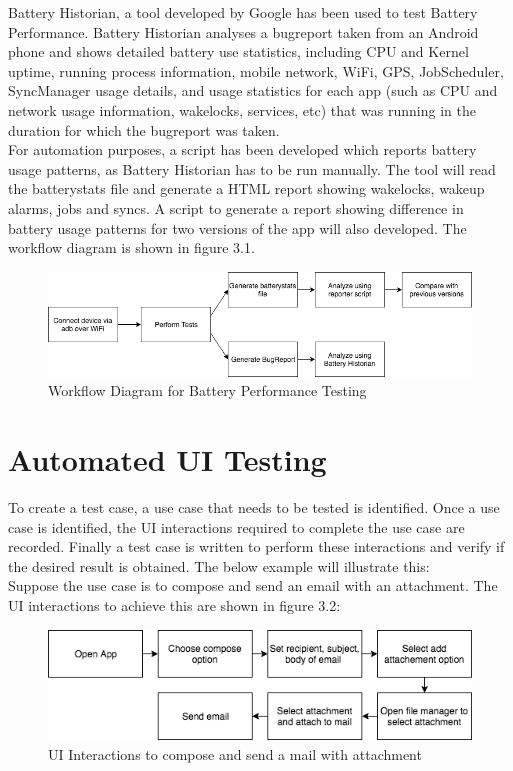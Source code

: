 Battery Historian, a tool developed by Google has been used to test Battery Performance. Battery Historian analyses a bugreport taken from an Android phone and shows detailed battery use statistics, including CPU and Kernel uptime, running process information, mobile network, WiFi, GPS, JobScheduler, SyncManager usage details, and usage statistics for each app (such as CPU and network usage information, wakelocks, services, etc) that was running in the duration for which the bugreport was taken.\cite{batteryhistorian} \\

For automation purposes, a script has been developed which reports battery usage patterns, as Battery Historian has to be run manually. The tool will read the batterystats file and generate a HTML report showing wakelocks, wakeup alarms, jobs and syncs. A script to generate a report showing difference in battery usage patterns for two versions of the app will also developed. The workflow diagram is shown in figure 3.1.

\begin{figure}[!h]
 	\begin{center}
		\includegraphics[scale=0.6]{Workflow}
		\caption{Workflow Diagram for Battery Performance Testing}
	\end{center}
\end{figure}

\section{Automated UI Testing}

To create a test case, a use case that needs to be tested is identified. Once a use case is identified, the UI interactions required to complete the use case are recorded. Finally a test case is written to perform these interactions and verify if the desired result is obtained. The below example will illustrate this:\\

Suppose the use case is to compose and send an email with an attachment. The UI interactions to achieve this are shown in figure 3.2:
\vspace{0.5cm}
\begin{figure}[!h]
 	\begin{center}
		\includegraphics[scale=0.7]{uiflow}
		\caption{UI Interactions to compose and send a mail with attachment}
	\end{center}
\end{figure}

